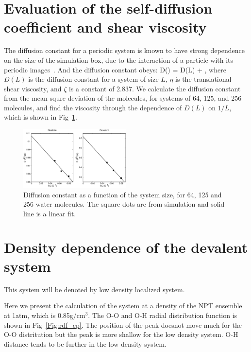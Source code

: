 \documentclass[aps,prl,reprint,amsmath,amssymb]{revtex4-1}
\begin{document}
\section{Evaluation of the self-diffusion coefficient and shear viscosity} 

The diffusion constant for a periodic system is known to have strong dependence on the size of the simulation box, due to the interaction of a particle with its periodic images~\cite{dunweg1993molecular}. 
And the diffusion constant obeys:
%
\bea
D(\infty) = D(L) + ,
\eea
%
where $D(L)$ is the diffusion constant for a system of size $L$, $\eta$ is the translational shear viscosity, and $\zeta$ is a constant of 2.837. 
We calculate the diffusion constant from the mean squre deviation of the molecules, for systems of 64, 125, and 256 molecules, and find the viscosity through the dependence of $D(L)$ on $1/L$, which is shown in Fig~\ref{Fig:dfs}.

\begin{figure}
\includegraphics[width=0.5\textwidth]{msd}
\caption{Diffusion constant as a function of the system size, for 64, 125 and 256 water molecules. 
The square dots are from simulation and solid line is a linear fit.}\label{Fig:dfs}
\end{figure} 

\section{Density dependence of the devalent system} 

This system will be denoted by low density localized system.

Here we present the calculation of the system at a density of the NPT ensemble at 1atm, which is 0.85g/cm$^3$. 
The O-O and O-H radial distribution function is shown in Fig~\ref{Fig:rdf_cp}. 
The position of the peak doesnot move much for the O-O distritution but the peak is more shallow for the low density system. 
O-H distance tends to be further in the low density system.
\end{document}
